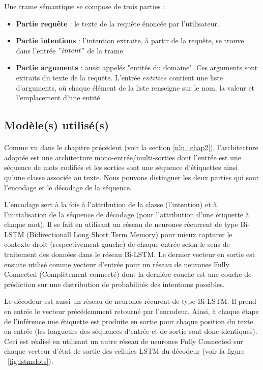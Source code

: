 	\par
	Une trame sémantique se compose de trois parties :
	\begin{itemize}
		\item \textbf{Partie requête} : le texte de la requête énoncée par l'utilisateur.
		\item \textbf{Partie intentions} : l'intention extraite, à partir de la requête, se trouve dans l'entrée $"intent"$ de la trame.
		\item \textbf{Partie arguments} : aussi appelés "entités du domaine". Ces arguments sont extraits du texte de la requête. L'entrée $entities$ contient une liste d'arguments, où chaque élément de la liste renseigne sur le nom, la valeur et l'emplacement d'une entité.
	\end{itemize}
	\subsection{Modèle(s) utilisé(s)}
		\paragraph{}\label{joint_model}
		Comme vu dans le chapitre précédent (voir la section \ref{nlu_chap2}), l'architecture adoptée est une architecture mono-entrée/multi-sorties dont l'entrée est une séquence de mots codifiés et les sorties sont une séquence d'étiquettes ainsi qu'une classe associée au texte. Nous pouvons distinguer les deux parties qui sont l'encodage et le décodage de la séquence. 
		\par L'encodage sert à la fois à l'attribution de la classe (l'intention) et à l'initialisation de la séquence de décodage (pour l'attribution d'une étiquette à chaque mot).
		Il se fait en utilisant un réseau de neurones récurrent de type Bi-LSTM (Bidirectionall Long Short Term Memory) pour mieux capturer le contexte droit (respectivement gauche) de chaque entrée selon le sens de traitement des données dans le réseau Bi-LSTM. Le dernier vecteur en sortie est ensuite utilisé comme vecteur d'entrée pour un réseau de neurones Fully Connected (Complètement connecté) dont la dernière couche est une couche de prédiction sur une distribution de probabilités des intentions possibles.
		\par
		Le décodeur est aussi un réseau de neurones récurent de type Bi-LSTM. Il prend en entrée le vecteur précédemment retourné par l'encodeur. Ainsi, à chaque étape de l'inférence une étiquette est produite en sortie pour chaque position du texte en entrée (les longueurs des séquences d'entrée et de sortie sont donc identiques). Ceci est réalisé en utilisant un autre réseau de neurones Fully Connected sur chaque vecteur d'état de sortie des cellules LSTM du décodeur (voir la figure ~\ref{fig:lstmslots}).
